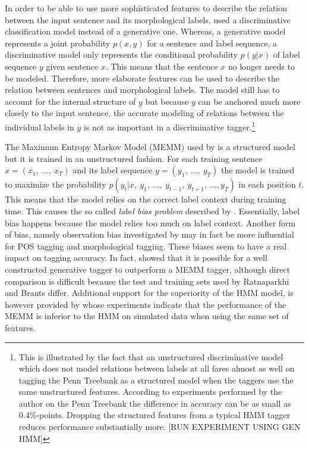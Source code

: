 In order to be able to use more sophisticated features to describe the
relation between the input sentence and its morphological labels,
\cite{Ratnaparkhi1997} used a discriminative classification model
instead of a generative one. Whereas, a generative model represents a
joint probability $p(x,y)$ for a sentence and label sequence, a
discriminative model only represents the conditional probability
$p(y|x)$ of label sequence $y$ given sentence $x$. This means that the
sentence $x$ no longer needs to be modeled. Therefore, more elaborate
features can be used to describe the relation between sentences and
morphological labels. The model still has to account for the internal
structure of $y$ but because $y$ can be anchored much more closely to
the input sentence, the accurate modeling of relations between the
individual labels in $y$ is not as important in a discriminative
tagger.\footnote{This is illustrated by the fact that an
  unstructured discriminative model which does not model relations
  between labels at all fares almost as well on tagging the Penn
  Treebank as a structured model when the taggers use the same
  unstructured features. According to experiments performed by the
  author on the Penn Treebank the difference in accuracy can be as
  small as 0.4\%-points. Dropping the structured features from a
  typical HMM tagger reduces performance substantially more. [RUN
  EXPERIMENT USING GEN HMM]}

The Maximum Entropy Markov Model (MEMM) used by \cite{Ratnaparkhi1997} is a
structured model but it is trained in an unstructured fashion. For
each training sentence $x = (x_1,\ ...,\ x_T)$ and its label sequence
$y = (y_1,\ ...,\ y_T)$ the model is trained to maximize the
probability $p(y_t| x,\ y_1,\ ...,\ y_{t - 1},\ y_{t+1},\ ..., y_T)$
in each position $t$. This means that the model relies on the correct
label context during training time. This causes the so called {\it
  label bias problem} described by \cite{Lafferty2001}. Essentially,
label bias happens because the model relies too much on label
context. Another form of bias, namely observation bias investigated by
\cite{Klein2002} may in fact be more influential for POS tagging and
morphological tagging. These biases seem to have a real impact on
tagging accuracy. In fact, \cite{Brants2000} showed that it is
possible for a well constructed generative tagger to outperform a MEMM
tagger, although direct comparison is difficult because the test and
training sets used by Ratnaparkhi and Brants differ. Additional
support for the superiority of the HMM model, is however provided by
\cite{Lafferty2001} whose experiments indicate that the performance of
the MEMM is inferior to the HMM on simulated data when using the same
set of features.

